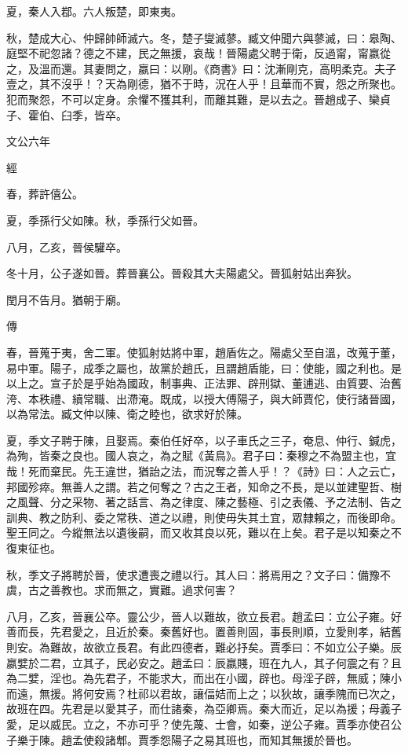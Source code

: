 \documentclass{ctexart}
\begin{document}
夏，秦人入鄀。六人叛楚，即東夷。

秋，楚成大心、仲歸帥師滅六。冬，楚子燮滅蓼。臧文仲聞六與蓼滅，曰：皋陶、庭堅不祀忽諸？德之不建，民之無援，哀哉！晉陽處父聘于衛，反過甯，甯嬴從之，及溫而還。其妻問之，嬴曰：以剛。《商書》曰：沈漸剛克，高明柔克。夫子壹之，其不沒乎！？天為剛德，猶不于時，況在人乎！且華而不實，怨之所聚也。犯而聚怨，不可以定身。余懼不獲其利，而離其難，是以去之。晉趙成子、欒貞子、霍伯、臼季，皆卒。





文公六年


經



春，葬許僖公。

夏，季孫行父如陳。秋，季孫行父如晉。

八月，乙亥，晉侯驩卒。

冬十月，公子遂如晉。葬晉襄公。晉殺其大夫陽處父。晉狐射姑出奔狄。

閏月不告月。猶朝于廟。

傳



春，晉蒐于夷，舍二軍。使狐射姑將中軍，趙盾佐之。陽處父至自溫，改蒐于董，易中軍。陽子，成季之屬也，故黨於趙氏，且謂趙盾能，曰：使能，國之利也。是以上之。宣子於是乎始為國政，制事典、正法罪、辟刑獄、董逋逃、由質要、治舊洿、本秩禮、續常職、出滯淹。既成，以授大傅陽子，與大師賈佗，使行諸晉國，以為常法。臧文仲以陳、衛之睦也，欲求好於陳。

夏，季文子聘于陳，且娶焉。秦伯任好卒，以子車氏之三子，奄息、仲行、鍼虎，為殉，皆秦之良也。國人哀之，為之賦《黃鳥》。君子曰：秦穆之不為盟主也，宜哉！死而棄民。先王違世，猶詒之法，而況奪之善人乎！？《詩》曰：人之云亡，邦國殄瘁。無善人之謂。若之何奪之？古之王者，知命之不長，是以並建聖哲、樹之風聲、分之采物、著之話言、為之律度、陳之藝極、引之表儀、予之法制、告之訓典、教之防利、委之常秩、道之以禮，則使毋失其土宜，眾隸賴之，而後即命。聖王同之。今縱無法以遺後嗣，而又收其良以死，難以在上矣。君子是以知秦之不復東征也。

秋，季文子將聘於晉，使求遭喪之禮以行。其人曰：將焉用之？文子曰：備豫不虞，古之善教也。求而無之，實難。過求何害？

八月，乙亥，晉襄公卒。靈公少，晉人以難故，欲立長君。趙孟曰：立公子雍。好善而長，先君愛之，且近於秦。秦舊好也。置善則固，事長則順，立愛則孝，結舊則安。為難故，故欲立長君。有此四德者，難必抒矣。賈季曰：不如立公子樂。辰嬴嬖於二君，立其子，民必安之。趙孟曰：辰嬴賤，班在九人，其子何震之有？且為二嬖，淫也。為先君子，不能求大，而出在小國，辟也。母淫子辟，無威；陳小而遠，無援。將何安焉？杜祁以君故，讓偪姞而上之；以狄故，讓季隗而已次之，故班在四。先君是以愛其子，而仕諸秦，為亞卿焉。秦大而近，足以為援；母義子愛，足以威民。立之，不亦可乎？使先蔑、士會，如秦，逆公子雍。賈季亦使召公子樂于陳。趙孟使殺諸郫。賈季怨陽子之易其班也，而知其無援於晉也。
\end{document}
